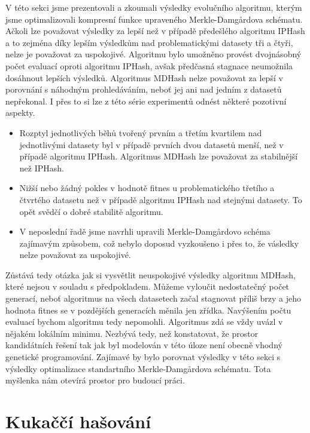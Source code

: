 V této sekci jsme prezentovali a zkoumali výsledky evolučního algoritmu, kterým jsme optimalizovali kompresní funkce
upraveného Merkle-Damg\r{a}rdova schématu. Ačkoli lze považovat výsledky za lepší než v případě předešlého algoritmu IPHash a to
zejména díky lepším výsledkům nad problematickými datasety tři a čtyři, nelze je považovat za uspokojivé. Algoritmu bylo
umožněno provést dvojnásobný počet evaluací oproti algoritmu IPHash, avšak předčasná stagnace neumožnila dosáhnout lepších
výsledků. Algoritmus MDHash nelze považovat za lepší v porovnání s náhodným prohledáváním, neboť jej ani nad jedním z datasetů
nepřekonal. I přes to si lze z této série experimentů odnést některé pozotivní aspekty.

\begin{itemize}
	\item Rozptyl jednotlivých běhů tvořený prvním a třetím kvartilem nad jednotlivými datasety byl v případě prvních dvou datasetů menší, než
		v případě algoritmu IPHash. Algoritmus MDHash lze považovat za stabilnější než IPHash.
	
	\item Nižší nebo žádný pokles v hodnotě fitnes u problematického třetího a čtvrtého datasetu než v případě algoritmu IPHash nad stejnými
		datasety. To opět svědčí o dobré stabilitě algoritmu.
		
	\item V neposlední řadě jsme navrhli upravili Merkle-Damg\r{a}rdovo schéma zajímavým způsobem, což nebylo doposud vyzkoušeno i přes to,
		že vásledky nelze považovat za uspokojivé.
\end{itemize}

Zůstává tedy otázka jak si vysvětlit neuspokojivé výsledky algoritmu MDHash, které nejsou v souladu s předpokladem. Můžeme vyloučit
nedostatečný počet generací, neboť algoritmus na všech datasetech začal stagnovat příliš brzy a jeho hodnota fitnes se v pozdějších
generacích měnila jen zřídka. Navýšením počtu evaluací bychom algoritmu tedy nepomohli. Algoritmus zdá se vždy uvázl v nějakém lokálním
minimu. Nezbývá tedy, než konstatovat, že prostor kandidátních řešení tak jak byl modelován v této úloze není obecně vhodný genetické
programování. Zajímavé by bylo porovnat výsledky v této sekci s výsledky optimalizace standartního Merkle-Damg\r{a}rdova schématu. Tota
myšlenka nám otevírá prostor pro budoucí práci.

\newpage
\section{Kukaččí hašování}

